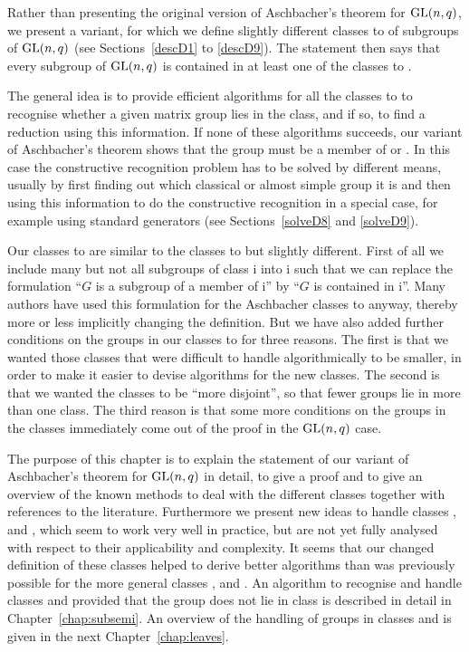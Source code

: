 Rather than presenting the original version of Aschbacher's theorem
for $\GL(n,q)$, we present a variant, for which we define slightly
different classes  to  of subgroups of $\GL(n,q)$ (see 
Sections~\ref{descD1} to \ref{descD9}). The statement
then says that every subgroup of $\GL(n,q)$ is contained in at least one
of the classes  to . 

The general idea is to provide efficient algorithms for all the classes  to
 to recognise whether a given matrix group lies in the class, and if
so, to find a reduction using this information. If none of these algorithms
succeeds, our variant of Aschbacher's theorem shows that the group must
be a member of  or . In this case the constructive recognition problem
has to be
solved by different means, usually by first finding out which classical
or almost simple group it is and then using this information to do the
constructive recognition in a special case, for example using standard
generators (see Sections~\ref{solveD8} and \ref{solveD9}).

Our classes  to  are similar to the classes  to  but
slightly different. First of all we include many but not all subgroups of
class \CC i into \DD i such that we can replace the formulation ``$G$ is a
subgroup of a member of \CC i'' by ``$G$ is contained in \DD i''. Many
authors have used this formulation for the Aschbacher classes  to
 anyway, thereby more or less implicitly changing the definition. 
But we have also added further conditions on the groups
in our classes  to  for three reasons. The first is that we
wanted those classes that were difficult to handle algorithmically
to be smaller, in order to make it easier to devise algorithms for
the new classes. The second is that we wanted the classes to be
``more disjoint'', so that fewer groups lie in more than one
class. The third reason is that some more conditions on the groups in
the classes immediately come out of the proof in the $\GL(n,q)$ case.

The purpose of this chapter is to explain the statement of our variant 
of Aschbacher's 
theorem for $\GL(n,q)$ in detail, to give a proof and to give an
overview of the known methods to deal with the different classes
together with references to the literature. Furthermore we present new 
ideas to handle classes ,  and , which seem to work very
well in practice, but are not yet fully analysed with respect to their
applicability and complexity. It seems that our changed definition of
these classes helped to derive better algorithms than was previously
possible for the more general classes ,  and .
An algorithm to recognise
and handle classes  and  provided that the group does not lie in
class  is described in detail in Chapter~\ref{chap:subsemi}.
An overview of the handling of groups in classes  and  is
given in the next Chapter~\ref{chap:leaves}.

